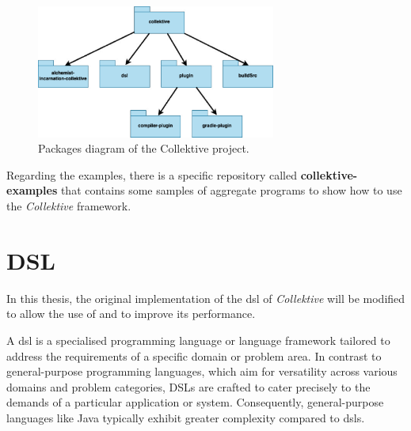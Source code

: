 \begin{figure}[h!]
    \centering
    \includegraphics[width=0.7\textwidth]{figures/packages}
    \caption{Packages diagram of the Collektive project.}
    \label{fig:pacakges}
\end{figure}

Regarding the examples, there is a specific repository called \textbf{collektive-examples} that contains some samples of
aggregate programs to show how to use the \emph{Collektive} framework.

\section{DSL}
\label{sec:dsl}

In this thesis, the original implementation of the \ac{dsl} of \emph{Collektive} will be modified to allow the use of \xc{}
and to improve its performance.

A \ac{dsl} is a specialised programming language or language framework tailored to address the
requirements of a specific domain or problem area.
In contrast to general-purpose programming languages, which aim for versatility across various domains and problem categories,
DSLs are crafted to cater precisely to the demands of a particular application or system.
Consequently, general-purpose languages like Java typically exhibit greater complexity compared to \acp{dsl}.


